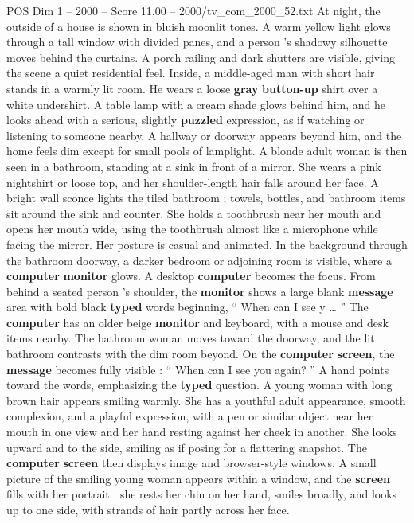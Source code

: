 \begin{textsample}{POS Dim 1 – 2000 – Score 11.00 – 2000/tv\_com\_2000\_52.txt}  \label{ex:f1_pos_040}
At night, the outside of a house is shown in bluish moonlit tones.
A warm yellow light glows through a tall window with divided panes, and a person ’s shadowy silhouette moves behind the curtains.
A porch railing and dark shutters are visible, giving the scene a quiet residential feel.
Inside, a middle-aged man with short hair stands in a warmly lit room.
He wears a loose \textbf{gray} \textbf{button-up} shirt over a white undershirt.
A table lamp with a cream shade glows behind him, and he looks ahead with a serious, slightly \textbf{puzzled} expression, as if watching or listening to someone nearby.
A hallway or doorway appears beyond him, and the home feels dim except for small pools of lamplight.
A blonde adult woman is then seen in a bathroom, standing at a sink in front of a mirror.
She wears a pink nightshirt or loose top, and her shoulder-length hair falls around her face.
A bright wall sconce lights the tiled bathroom ; towels, bottles, and bathroom items sit around the sink and counter.
She holds a toothbrush near her mouth and opens her mouth wide, using the toothbrush almost like a microphone while facing the mirror.
Her posture is casual and animated.
In the background through the bathroom doorway, a darker bedroom or adjoining room is visible, where a \textbf{computer} \textbf{monitor} glows.
A desktop \textbf{computer} becomes the focus.
From behind a seated person ’s shoulder, the \textbf{monitor} shows a large blank \textbf{message} area with bold black \textbf{typed} words beginning, “ When can I see y … ” The \textbf{computer} has an older beige \textbf{monitor} and keyboard, with a mouse and desk items nearby.
The bathroom woman moves toward the doorway, and the lit bathroom contrasts with the dim room beyond.
On the \textbf{computer} \textbf{screen}, the \textbf{message} becomes fully visible : “ When can I see you again? ” A hand points toward the words, emphasizing the \textbf{typed} question.
A young woman with long brown hair appears smiling warmly.
She has a youthful adult appearance, smooth complexion, and a playful expression, with a pen or similar object near her mouth in one view and her hand resting against her cheek in another.
She looks upward and to the side, smiling as if posing for a flattering snapshot.
The \textbf{computer} \textbf{screen} then displays image and browser-style windows.
A small picture of the smiling young woman appears within a window, and the \textbf{screen} fills with her portrait : she rests her chin on her hand, smiles broadly, and looks up to one side, with strands of hair partly across her face.

\end{textsample}
